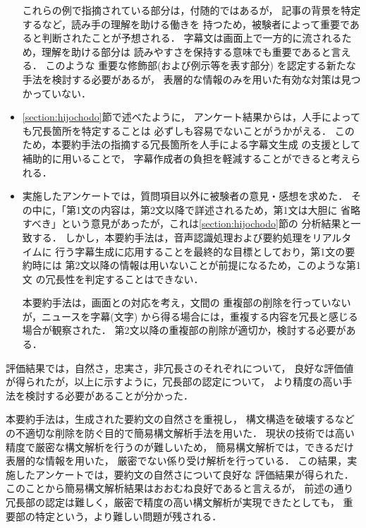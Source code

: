 \begin{itemize}
\begin{enumerate}
       \end{enumerate}

       これらの例で指摘されている部分は，付随的ではあるが，
       記事の背景を特定するなど，読み手の理解を助ける働きを
       持つため，被験者によって重要であると判断されたことが予想される．
       字幕文は画面上で一方的に流されるため，理解を助ける部分は
       読みやすさを保持する意味でも重要であると言える．
       このような
       重要な修飾部(および例示等を表す部分)
       を認定する新たな手法を検討する必要があるが，
       表層的な情報のみを用いた有効な対策は見つかっていない．

 \item \ref{section:hijochodo}節で述べたように，
       アンケート結果からは，人手によっても冗長箇所を特定することは
       必ずしも容易でないことがうかがえる．
       このため，本要約手法の指摘する冗長箇所を人手による字幕文生成
       の支援として補助的に用いることで，
       字幕作成者の負担を軽減することができると考えられる．

 \item 
       実施したアンケートでは，質問項目以外に被験者の意見・感想を求めた．
       その中に，「第1文の内容は，第2文以降で詳述されるため，第1文は大胆に
       省略すべき」という意見があったが，これは\ref{section:hijochodo}節の
       分析結果と一致する．
       しかし，本要約手法は，音声認識処理および要約処理をリアルタイムに
       行う字幕生成に応用することを最終的な目標としており，第1文の要約時には
       第2文以降の情報は用いないことが前提になるため，このような第1文
       の冗長性を判定することはできない．

       本要約手法は，画面との対応を考え，文間の
       重複部の削除を行っていないが，ニュースを字幕(文字)
       から得る場合には，重複する内容を冗長と感じる場合が観察された．
       第2文以降の重複部の削除が適切か，検討する必要がある．

\end{itemize}
評価結果では，自然さ，忠実さ，非冗長さのそれぞれについて，
良好な評価値が得られたが，以上に示すように，冗長部の認定について，
より精度の高い手法を検討する必要があることが分かった．

本要約手法は，生成された要約文の自然さを重視し，
構文構造を破壊するなどの不適切な削除を防ぐ目的で簡易構文解析手法を用いた．
現状の技術では高い精度で厳密な構文解析を行うのが難しいため，
簡易構文解析では，できるだけ表層的な情報を用いた，
厳密でない係り受け解析を行っている．
この結果，実施したアンケートでは，要約文の自然さについて良好な
評価結果が得られた．
このことから簡易構文解析結果はおおむね良好であると言えるが，
前述の通り冗長部の認定は難しく，厳密で精度の高い構文解析が実現できたとしても，
重要部の特定という，より難しい問題が残される．

